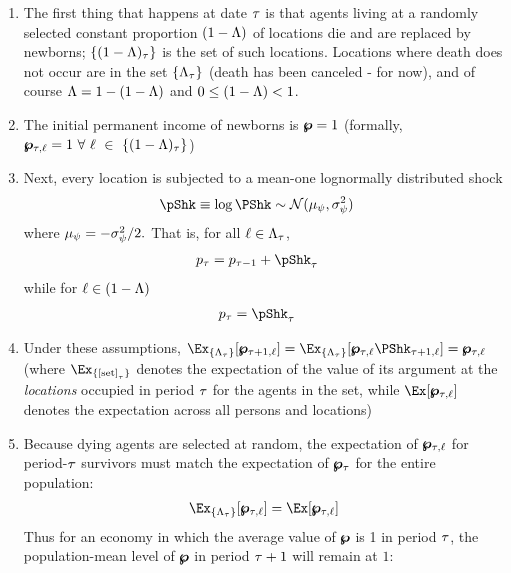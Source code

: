 \documentclass[\econtexRoot/BufferStockTheory.tex]{subfiles}
\begin{document}
\begin{enumerate}
\item The first thing that happens at date $\tau$ is that agents living at a randomly selected constant proportion $(1-\Lambda)$ of locations die and are replaced by newborns; $\{(1-\Lambda)_{\tau}\}$ is the set of such locations.  Locations where death does not occur are in the set  $\{\Lambda_{\tau}\}$ (death has been canceled - for now), and of course $\Lambda=1-(1-\Lambda)$ and $0 \leq (1-\Lambda) < 1$.
\item The initial permanent income of newborns is  $\pmb{\wp}=1$ (formally, $\pmb{\wp}_{\tau,\ell} = 1~\forall~\ell~\in~\{(1-\Lambda)_{\tau}\}$)
\item Next, every location is subjected to a mean-one lognormally distributed shock
  \begin{align}
    \pShk & \equiv \log \PShk \sim \mathcal{N}(\pShkMean,\sigma^{2}_{\DnsShk}) \label{eq:pShkDef}
  \end{align}
  where $\mu_{\psi} = -\sigma^{2}_{\psi}/2.$  That is, for all $\ell \in \Lambda_{\tau}$, 
  \begin{align}
    \pLog_{\tAbs} & = \pLog_{\tAbs-1}+\pShk_{\tAbs} \label{eq:pRandomwalk}
  \end{align}
  while for $\ell \in (1-\Lambda)$
  \begin{align}
    \pLog_{\tAbs} & = \pShk_{\tAbs} \label{eq:pStartsAtZero}
  \end{align}
\item Under these assumptions, $\Ex_{\{\Liv_{\tAbs}\}}[\pLev_{\tAbs+1,\posn}]=\Ex_{\{\Liv_{\tAbs}\}}[\pLev_{\tAbs,\posn}\PShk_{\tAbs+1,\posn}]=\pLev_{\tAbs,\posn}$ (where $\Ex_{\{\text{[set]}_{\tAbs}\}}$ denotes the expectation of the value of its argument at the \emph{locations} occupied in period $\tau$ for the agents in the set, while  $\Ex[\pLev_{\tAbs,\posn}]$ denotes the expectation across all persons and locations)      
\item Because dying agents are selected at random, the expectation of $\pmb{\wp}_{\tau,\ell}$ for period-$\tau$ survivors must match the expectation of $\pmb{\wp}_{\tau}$ for the entire population:
  \begin{align}
    \Ex_{\{\Liv_{\tAbs}\}}[\pLev_{\tAbs,\posn}]=\Ex[\pLev_{\tAbs,\posn}] \label{eq:pLevLivIsOne}
  \end{align}
  Thus for an economy in which the average value of $\pmb{\wp}$ is 1 in period $\tau$, the population-mean level of $\pmb{\wp}$ in period $\tau+1$ will remain at $1$:
\end{enumerate}
\end{document}
